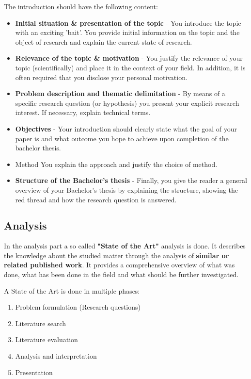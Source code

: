 \documentclass[a4paper,11pt,fleqn]{book}
\begin{document}
The introduction should have the following content:
\begin{itemize}
  \item \textbf{Initial situation & presentation of the topic} - You introduce the topic with an exciting 'bait'. You provide initial information on the topic and the object of research and explain the current state of research.
  \item \textbf{Relevance of the topic & motivation} - You justify the relevance of your topic (scientifically) and place it in the context of your field. In addition, it is often required that you disclose your personal motivation.
  \item \textbf{Problem description and thematic delimitation} - By means of a specific research question (or hypothesis) you present your explicit research interest. If necessary, explain technical terms.
  \item \textbf{Objectives} - Your introduction should clearly state what the goal of your paper is and what outcome you hope to achieve upon completion of the bachelor thesis.
  \item Method You explain the approach and justify the choice of method.
  \item \textbf{Structure of the Bachelor's thesis} - Finally, you give the reader a general overview of your Bachelor's thesis by explaining the structure, showing the red thread and how the research question is answered.
\end{itemize}

\subsection{Analysis}
In the analysis part a so called \textbf{"State of the Art"} analysis is done. It describes the knowledge about the studied matter through the analysis of \textbf{similar or related published work}. It provides a comprehensive overview of what was done, what has been done in the field and what should be further investigated.

A State of the Art is done in multiple phases:
\begin{enumerate}
  \item Problem formulation (Research questions)
  \item Literature search
  \item Literature evaluation
  \item Analysis and interpretation
  \item Presentation
\end{enumerate}
\end{document}
